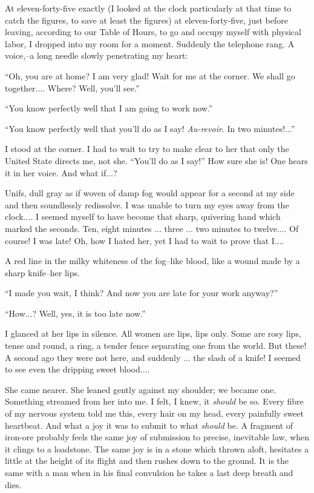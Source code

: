 \documentclass[11pt,openany]{book}
\begin{document}
At eleven-forty-five exactly (I looked at the clock particularly at that time to catch the figures, to save at least the figures) at eleven-forty-five, just before leaving, according to our Table of Hours, to go and occupy myself with physical labor, I dropped into my room for a moment. Suddenly the telephone rang. A voice,--a long needle slowly penetrating my heart:

``Oh, you are at home? I am very glad! Wait for me at the corner. We shall go together.... Where? Well, you'll see.''

``You know perfectly well that I am going to work now.''

``You know perfectly well that you'll do as I say! \emph{Au-revoir}. In two minutes!...''

I stood at the corner. I had to wait to try to make clear to her that only the United State directs me, not she. ``You'll do as I say!'' How sure she is! One hears it in her voice. And what if...?

Unifs, dull gray as if woven of damp fog would appear for a second at my side and then soundlessly redissolve. I was unable to turn my eyes away from the clock.... I seemed myself to have become that sharp, quivering hand which marked the seconds. Ten, eight minutes ... three ... two minutes to twelve.... Of course! I was late! Oh, how I hated her, yet I had to wait to prove that I....

A red line in the milky whiteness of the fog--like blood, like a wound made by a sharp knife--her lips.

``I made you wait, I think? And now you are late for your work anyway?''

``How...? Well, yes, it is too late now.''

I glanced at her lips in silence. All women are lips, lips only. Some are rosy lips, tense and round, a ring, a tender fence separating one from the world. But these! A second ago they were not here, and suddenly ... the slash of a knife! I seemed to see even the dripping sweet blood....

She came nearer. She leaned gently against my shoulder; we became one. Something streamed from her into me. I felt, I knew, it \emph{should} be so. Every fibre of my nervous system told me this, every hair on my head, every painfully sweet heartbeat. And what a joy it was to submit to what \emph{should} be. A fragment of iron-ore probably feels the same joy of submission to precise, inevitable law, when it clings to a loadstone. The same joy is in a stone which thrown aloft, hesitates a little at the height of its flight and then rushes down to the ground. It is the same with a man when in his final convulsion he takes a last deep breath and dies.
\end{document}
